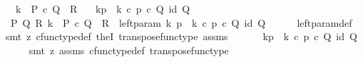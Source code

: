 \begin{isabellebody}
\ \ \ {\isachardoublequoteopen}k\ {\isacharcolon}{\kern0pt}\ P\ {\isasymtimes}\isactrlsub c\ Q\ {\isasymrightarrow}\ R{\isachardoublequoteclose}\isanewline
\ \ \ {\isachardoublequoteopen}k\isactrlbsub {\isacharbrackleft}{\kern0pt}p{\isacharcomma}{\kern0pt}{\isacharminus}{\kern0pt}{\isacharbrackright}{\kern0pt}\isactrlesub \ {\isasymequiv}\ k\ {\isasymcirc}\isactrlsub c\ {\isasymlangle}p\ {\isasymcirc}\isactrlsub c\ {\isasymbeta}\isactrlbsub Q\isactrlesub {\isacharcomma}{\kern0pt}\ id\ Q{\isasymrangle}{\isachardoublequoteclose}\isanewline
%
\isadelimproof
%
\endisadelimproof
%
\isatagproof
{}\isamarkupfalse%
\ {\isacharminus}{\kern0pt}\ \isanewline
\ \ \isamarkupfalse%
\ {\isachardoublequoteopen}{\isasymexists}\ P\ Q\ R{\isachardot}{\kern0pt}\ k\ {\isacharcolon}{\kern0pt}\ P\ {\isasymtimes}\isactrlsub c\ Q\ {\isasymrightarrow}\ R\ {\isasymand}\ left{\isacharunderscore}{\kern0pt}param\ k\ p\ {\isacharequal}{\kern0pt}\ k\ {\isasymcirc}\isactrlsub c\ {\isasymlangle}p\ {\isasymcirc}\isactrlsub c\ {\isasymbeta}\isactrlbsub Q\isactrlesub {\isacharcomma}{\kern0pt}\ id\ Q{\isasymrangle}{\isachardoublequoteclose}\isanewline
\ \ \ \ \isamarkupfalse%
\ left{\isacharunderscore}{\kern0pt}param{\isacharunderscore}{\kern0pt}def\ \isamarkupfalse%
\ {\isacharparenleft}{\kern0pt}smt\ {\isacharparenleft}{\kern0pt}z{}{\isacharparenright}{\kern0pt}\ cfunc{\isacharunderscore}{\kern0pt}type{\isacharunderscore}{\kern0pt}def\ the{}I{}\ transpose{\isacharunderscore}{\kern0pt}func{\isacharunderscore}{\kern0pt}type\ assms{\isacharparenright}{\kern0pt}\ \isanewline
\ \ \isamarkupfalse%
\ \isamarkupfalse%
\ {\isachardoublequoteopen}k\isactrlbsub {\isacharbrackleft}{\kern0pt}p{\isacharcomma}{\kern0pt}{\isacharminus}{\kern0pt}{\isacharbrackright}{\kern0pt}\isactrlesub \ {\isasymequiv}\ k\ {\isasymcirc}\isactrlsub c\ {\isasymlangle}p\ {\isasymcirc}\isactrlsub c\ {\isasymbeta}\isactrlbsub Q\isactrlesub {\isacharcomma}{\kern0pt}\ id\ Q{\isasymrangle}{\isachardoublequoteclose}\isanewline
\ \ \ \ \isamarkupfalse%
\ {\isacharparenleft}{\kern0pt}smt\ {\isacharparenleft}{\kern0pt}z{}{\isacharparenright}{\kern0pt}\ assms\ cfunc{\isacharunderscore}{\kern0pt}type{\isacharunderscore}{\kern0pt}def\ transpose{\isacharunderscore}{\kern0pt}func{\isacharunderscore}{\kern0pt}type{\isacharparenright}{\kern0pt}\isanewline
{}\isamarkupfalse%
%
\endisatagproof
{\isafoldproof}%
%
\isadelimproof

\end{isabellebody}
